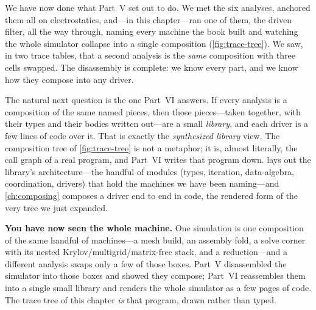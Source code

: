 We have now done what Part~V set out to do. We met the six analyses, anchored them
all on electrostatics, and---in this chapter---ran one of them, the driven filter,
all the way through, naming every machine the book built and watching the whole
simulator collapse into a single composition (\cref{fig:trace-tree}). We saw, in two
trace tables, that a second analysis is the \emph{same} composition with three cells
swapped. The disassembly is complete: we know every part, and we know how they
compose into any driver.

The natural next question is the one Part~VI answers. If every analysis is a
composition of the same named pieces, then those pieces---taken together, with their
types and their bodies written out---are a small \emph{library}, and each driver is a
few lines of code over it. That is exactly the \emph{synthesized library} view. The
composition tree of \cref{fig:trace-tree} is not a metaphor; it is, almost literally,
the call graph of a real program, and Part~VI writes that program down. 
lays out the library's architecture---the handful of modules (types, iteration,
data-algebra, coordination, drivers) that hold the machines we have been naming---and
\cref{ch:composing} composes a driver end to end in code, the rendered form of the
very tree we just expanded.

\begin{keyidea}
\textbf{You have now seen the whole machine.} One simulation is one composition of
the same handful of machines---a mesh build, an assembly fold, a solve corner with
its nested Krylov/multigrid/matrix-free stack, and a reduction---and a different
analysis swaps only a few of those boxes. Part~V disassembled the simulator into
those boxes and showed they compose; Part~VI reassembles them into a single small
library and renders the whole simulator as a few pages of code. The trace tree of
this chapter \emph{is} that program, drawn rather than typed.
\end{keyidea}

